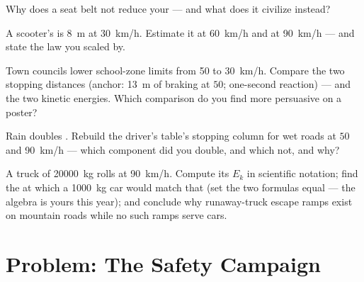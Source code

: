 \begin{exercise}[$\star$]\label{exo:g9:kinetic-energy-safety:8}
Why does a seat belt not reduce your  --- and
what does it civilize instead?
\end{exercise}

\begin{exercise}[$\star\star$]\label{exo:g9:kinetic-energy-safety:9}
A scooter's  is \qty{8}{m} at \qty{30}{km/h}.
Estimate it at \qty{60}{km/h} and at \qty{90}{km/h} --- and
state the law you scaled by.
\end{exercise}

\begin{exercise}[$\star\star$]\label{exo:g9:kinetic-energy-safety:10}
Town councils lower school-zone limits from \qty{50}{} to
\qty{30}{km/h}. Compare the two stopping distances (anchor:
\qty{13}{m} of braking at $50$; one-second reaction) --- and
the two kinetic energies. Which comparison do you find more
persuasive on a poster?
\end{exercise}

\begin{exercise}[$\star\star$]\label{exo:g9:kinetic-energy-safety:11}
Rain doubles . Rebuild the driver's table's
stopping column for wet roads at $50$ and \qty{90}{km/h} ---
which component did you double, and which not, and why?
\end{exercise}

\begin{exercise}[$\star\star\star$]\label{exo:g9:kinetic-energy-safety:12}
A truck of \qty{20000}{kg} rolls at \qty{90}{km/h}. Compute
its $E_k$ in scientific notation; find the  at which a
\qty{1000}{kg} car would match that  (set the two
formulas equal --- the algebra is yours this year); and
conclude why runaway-truck escape ramps exist on mountain
roads while no such ramps serve cars.
\end{exercise}

\section{Problem: The Safety Campaign}

